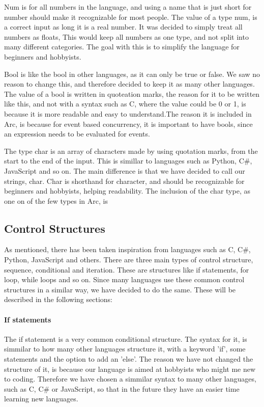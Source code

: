 Num is for all numbers in the language, and using a name that is just short for number should make it recognizable for most people. The value of a type num, is a correct input as long it is a real number. It was decided to simply treat all numbers as floats, This would keep all numbers as one type, and not split into many different categories. The goal with this is to simplify the language for beginners and hobbyists.

Bool is like the bool in other languages, as it can only be true or false. We saw no reason to change this, and therefore decided to keep it as many other languages. The value of a bool is written in quoteation marks, the reason for it to be written like this, and not with a syntax such as C, where the value could be 0 or 1, is because it is more readable and easy to understand.The reason it is included in Arc, is because for event based concurrency, it is important to have bools, since an expression needs to be evaluated for events.

The type char is an array of characters made by using quotation marks, from the start to the end of the input.  This is simillar to languages such as Python, C\#, JavaScript and so on. The main difference is that we have decided to call our strings, char. Char is shorthand for character, and should be recognizable for beginners and hobbyists, helping readability. The inclusion of the char type, as one on of the few types in Arc, is 
 
\subsection{Control Structures}
As mentioned, there has been taken inspiration from languages such as C, C\#, Python, JavaScript and others. There are three main types of control structure, sequence, conditional and iteration. These are structures like if statements, for loop, while loops and so on. Since many languages use these common control structures in a similar way, we have decided to do the same. These will be described in the following sections:

\paragraph*{If statements}
The if statement is a very common conditional structure. The syntax for it, is simmilar to how many other languages structure it, with a keyword 'if', some statements and the option to add an 'else'. The reason we have not changed the structure of it, is because our language is aimed at hobbyists who might me new to coding. Therefore we have chosen a simmilar syntax to many other languages, such as C, C\# or JavaScript, so that in the future they have an easier time learning new languages.


